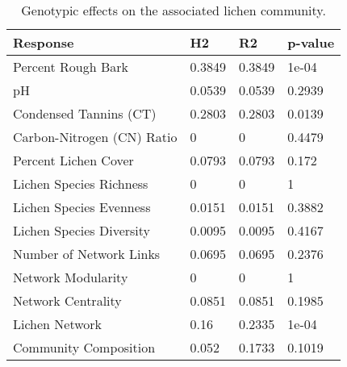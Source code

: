 \begin{table}[ht]
\centering
\begin{tabular}{llll}
  \hline
Response & H2 & R2 & p-value \\ 
  \hline
Percent Rough Bark & 0.3849 & 0.3849 & 1e-04 \\ 
  pH & 0.0539 & 0.0539 & 0.2939 \\ 
  Condensed Tannins (CT) & 0.2803 & 0.2803 & 0.0139 \\ 
  Carbon-Nitrogen (CN) Ratio & 0 & 0 & 0.4479 \\ 
  Percent Lichen Cover & 0.0793 & 0.0793 & 0.172 \\ 
  Lichen Species Richness & 0 & 0 & 1 \\ 
  Lichen Species Evenness & 0.0151 & 0.0151 & 0.3882 \\ 
  Lichen Species Diversity & 0.0095 & 0.0095 & 0.4167 \\ 
  Number of Network Links & 0.0695 & 0.0695 & 0.2376 \\ 
  Network Modularity & 0 & 0 & 1 \\ 
  Network Centrality & 0.0851 & 0.0851 & 0.1985 \\ 
  Lichen Network & 0.16 & 0.2335 & 1e-04 \\ 
  Community Composition & 0.052 & 0.1733 & 0.1019 \\ 
   \hline
\end{tabular}
\caption{Genotypic effects on the associated lichen community.} 
\label{tab:h2_table}
\end{table}
